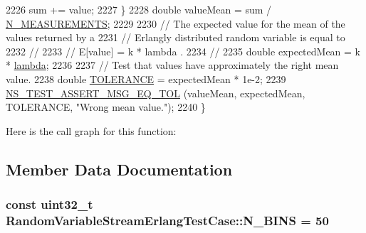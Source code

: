 \begin{DoxyCode}
2226       sum += value;
2227     \}
2228   \textcolor{keywordtype}{double} valueMean = sum / \hyperlink{classRandomVariableStreamErlangTestCase_a317b0f6b963f81bfb4b5a6962443b0e1}{N\_MEASUREMENTS};
2229 
2230   \textcolor{comment}{// The expected value for the mean of the values returned by a}
2231   \textcolor{comment}{// Erlangly distributed random variable is equal to }
2232   \textcolor{comment}{//}
2233   \textcolor{comment}{//     E[value]  =  k * lambda  .}
2234   \textcolor{comment}{//}
2235   \textcolor{keywordtype}{double} expectedMean = k * \hyperlink{loss__ITU1238_8m_aca36b09d6e71a60cfa3837d7e24c07ca}{lambda};
2236 
2237   \textcolor{comment}{// Test that values have approximately the right mean value.}
2238   \textcolor{keywordtype}{double} \hyperlink{spectrum-value-test_8cc_a30c17564229ec2e37dfea9c6c9ad643e}{TOLERANCE} = expectedMean * 1e-2;
2239   \hyperlink{group__testing_ga9e7861b56b4e70db3b56044cb7a28e41}{NS\_TEST\_ASSERT\_MSG\_EQ\_TOL} (valueMean, expectedMean, TOLERANCE, \textcolor{stringliteral}{"Wrong mean
       value."}); 
2240 \}
\end{DoxyCode}


Here is the call graph for this function\+:




\subsection{Member Data Documentation}
\subsubsection[{\texorpdfstring{N\+\_\+\+B\+I\+NS}{N_BINS}}]{\setlength{\rightskip}{0pt plus 5cm}const uint32\+\_\+t Random\+Variable\+Stream\+Erlang\+Test\+Case\+::\+N\+\_\+\+B\+I\+NS = 50\hspace{0.3cm}{\ttfamily [static]}}\hypertarget{classRandomVariableStreamErlangTestCase_a36dca3fad0131e9871b43ee1273ac354}{}\label{classRandomVariableStreamErlangTestCase_a36dca3fad0131e9871b43ee1273ac354}
